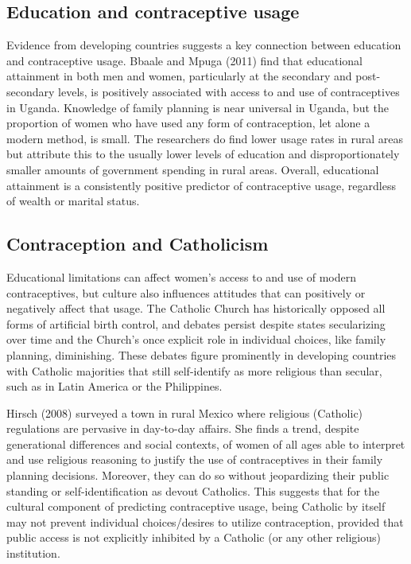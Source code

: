 \documentclass[12pt]{article}
\begin{document}
    \subsection{Education and contraceptive usage}
    Evidence from developing countries suggests a key connection between education and contraceptive usage.
    Bbaale and Mpuga (2011) find that educational attainment in both men and women, particularly at the secondary and post-secondary levels, is positively associated with access to and use of contraceptives in Uganda.
    Knowledge of family planning is near universal in Uganda, but the proportion of women who have used any form of contraception, let alone a modern method, is small.
    The researchers do find lower usage rates in rural areas but attribute this to the usually lower levels of education and disproportionately smaller amounts of government spending in rural areas.
    Overall, educational attainment is a consistently positive predictor of contraceptive usage, regardless of wealth or marital status.


    \subsection{Contraception and Catholicism}
    Educational limitations can affect women's access to and use of modern contraceptives, but culture also influences attitudes that can positively or negatively affect that usage.
    The Catholic Church has historically opposed all forms of artificial birth control, and debates persist despite states secularizing
    over time and the Church's once explicit role in individual choices, like family planning, diminishing.
    These debates figure prominently in developing countries with Catholic majorities that still self-identify as more religious than secular, such as in Latin America or the Philippines.

    Hirsch (2008) surveyed a town in rural Mexico where religious (Catholic) regulations are pervasive in day-to-day affairs.
    She finds a trend, despite generational differences and social contexts, of women of all ages able to interpret and use religious reasoning to justify the use of contraceptives in their family planning decisions.
    Moreover, they can do so without jeopardizing their public standing or self-identification as devout Catholics.
    This suggests that for the cultural component of predicting contraceptive usage, being Catholic by itself may not prevent individual choices/desires to utilize contraception, provided that public access is not explicitly inhibited by a Catholic (or any other religious) institution.
\end{document}

